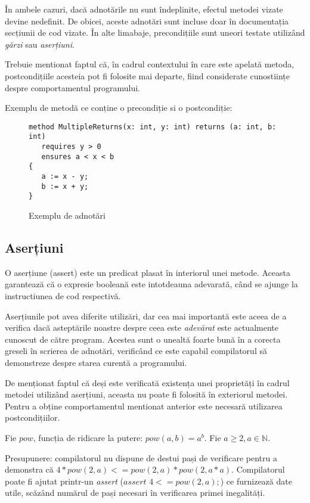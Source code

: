 În ambele cazuri, dacă adnotările nu sunt îndeplinite, efectul metodei vizate devine nedefinit. 
De obicei, aceste adnotări sunt incluse doar în documentația secțiunii de cod vizate. În alte limabaje, precondițiile sunt uneori testate utilizând \textit{gărzi} sau \textit{aserțiuni}.

Trebuie mentionat faptul că, în cadrul contextului în care este apelată metoda, postcondițiile acesteia pot fi folosite mai departe, fiind considerate cunostiințe despre comportamentul programului.

Exemplu de metodă ce conține o precondiție si o postcondiție:
\begin{figure}[H]
    \caption{Exemplu de adnotări}

\begin{Verbatim}[fontsize=\small, frame=single,baselinestretch=0.1]
method MultipleReturns(x: int, y: int) returns (a: int, b: int)
   requires y > 0
   ensures a < x < b
{
   a := x - y;
   b := x + y;
}
\end{Verbatim}
\end{figure}

\subsection{Aserțiuni}

\begin{definition}
O aserțiune (assert) este un predicat plasat în interiorul unei metode. Aceasta garantează că o expresie booleană este intotdeauna adevarată, când se ajunge la instructiunea de cod respectivă.
\end{definition}

Aserțiunile pot avea diferite utilizări, dar cea mai importantă este aceea de a verifica dacă asteptările noastre despre ceea este \textit{adevărat} este actualmente cunoscut de către program. Acestea sunt o unealtă foarte bună în a corecta greseli în scrierea de adnotări, verificând ce este capabil compilatorul să demonstreze despre starea curentă a programului.

De menționat faptul că deși este verificată existența unei proprietăți în cadrul metodei utilizând aserțiuni, aceasta nu poate fi folosită în exteriorul metodei. Pentru a obține comportamentul mentionat anterior este necesară utilizarea postcondițiilor.

Fie \textit{$pow$}, funcția de ridicare la putere: \textit{$pow(a,b) = a^b$}. Fie $a \geq 2, a \in \mathbb{N}.$ 

Presupunere: compilatorul nu dispune de destui pași de verificare pentru a demonstra că $ 4 * pow(2, a) <= pow(2, a) * pow(2, a * a).$ Compilatorul poate fi ajutat printr-un \textit{assert} ($assert$ $4 <= pow(2, a);$) ce furnizează date utile, scăzând numărul de pași necesari în verificarea primei inegalități. 

